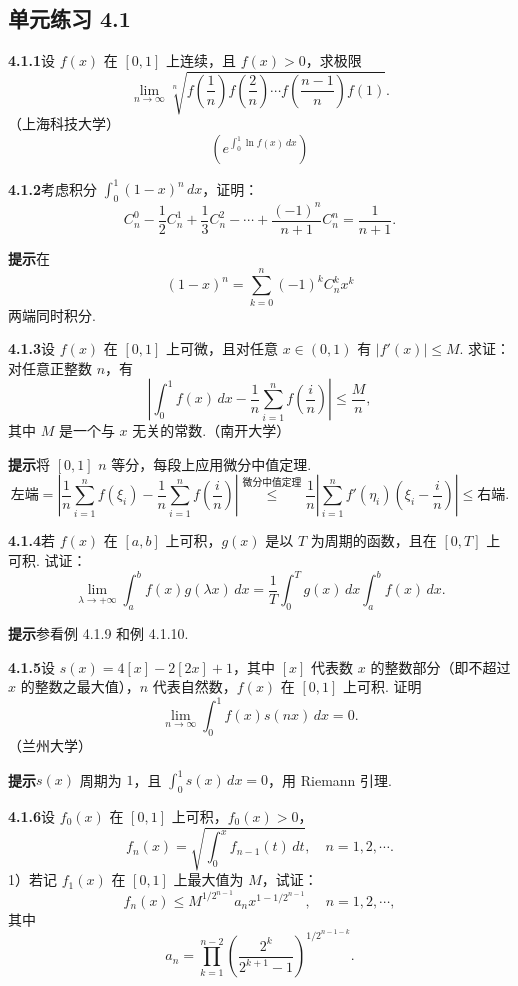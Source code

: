 \documentclass[UTF8, 12pt, fontset=fandol, oneside]{ctexart}
\begin{document}
\subsection*{单元练习 4.1}

\noindent\textbf{4.1.1}\quad 设 $f(x)$ 在 $[0,1]$ 上连续，且 $f(x)>0$，求极限
\[
\lim_{n\to\infty}
\sqrt[n]{f\left(\frac1n\right)f\left(\frac2n\right)\cdots
f\left(\frac{n-1}{n}\right)f(1)}.
\]
（上海科技大学）
\[
\left(e^{\int_0^1\ln f(x)\,dx}\right)
\]

\noindent\textbf{4.1.2}\quad 考虑积分 $\displaystyle\int_0^1(1-x)^n\,dx$，证明：
\[
C_n^0-\frac12C_n^1+\frac13C_n^2-\cdots+\frac{(-1)^n}{n+1}C_n^n
=\frac1{n+1}.
\]

\noindent\textbf{提示}\quad 在
\[
(1-x)^n=\sum_{k=0}^n(-1)^kC_n^kx^k
\]
两端同时积分.

\noindent\textbf{4.1.3}\quad 设 $f(x)$ 在 $[0,1]$ 上可微，且对任意 $x\in(0,1)$ 有 $|f'(x)|\le M$. 求证：对任意正整数 $n$，有
\[
\left|\int_0^1f(x)\,dx-\frac1n\sum_{i=1}^n f\left(\frac in\right)\right|
\le\frac Mn,
\]
其中 $M$ 是一个与 $x$ 无关的常数.（南开大学）

\noindent\textbf{提示}\quad 将 $[0,1]$ $n$ 等分，每段上应用微分中值定理.
\[
\text{左端}
=\left|\frac1n\sum_{i=1}^nf(\xi_i)-\frac1n\sum_{i=1}^nf\left(\frac in\right)\right|
\stackrel{\text{微分中值定理}}{\le}
\frac1n\left|\sum_{i=1}^nf'(\eta_i)\left(\xi_i-\frac in\right)\right|
\le\text{右端}.
\]

\noindent\textbf{4.1.4}\quad 若 $f(x)$ 在 $[a,b]$ 上可积，$g(x)$ 是以 $T$ 为周期的函数，且在 $[0,T]$ 上可积. 试证：
\[
\lim_{\lambda\to+\infty}\int_a^b f(x)g(\lambda x)\,dx
=\frac1T\int_0^Tg(x)\,dx\int_a^bf(x)\,dx.
\]

\noindent\textbf{提示}\quad 参看例 4.1.9 和例 4.1.10.

\noindent\textbf{4.1.5}\quad 设 $s(x)=4[x]-2[2x]+1$，其中 $[x]$ 代表数 $x$ 的整数部分（即不超过 $x$ 的整数之最大值），$n$ 代表自然数，$f(x)$ 在 $[0,1]$ 上可积. 证明
\[
\lim_{n\to\infty}\int_0^1f(x)s(nx)\,dx=0.
\]
（兰州大学）

\noindent\textbf{提示}\quad $s(x)$ 周期为 $1$，且 $\displaystyle\int_0^1s(x)\,dx=0$，用 Riemann 引理.

\noindent\textbf{4.1.6}\quad 设 $f_0(x)$ 在 $[0,1]$ 上可积，$f_0(x)>0$，
\[
f_n(x)=\sqrt{\int_0^x f_{n-1}(t)\,dt},\quad n=1,2,\cdots.
\]
1）若记 $f_1(x)$ 在 $[0,1]$ 上最大值为 $M$，试证：
\[
f_n(x)\le M^{1/2^{n-1}}a_nx^{1-1/2^{n-1}},\quad n=1,2,\cdots,
\]
其中
\[
a_n=\prod_{k=1}^{n-2}
\left(\frac{2^k}{2^{k+1}-1}\right)^{1/2^{n-1-k}}.
\]
\end{document}

